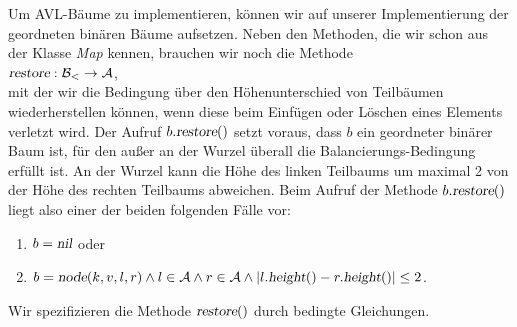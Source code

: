 Um  AVL-B\"aume zu  implementieren, k\"onnen wir auf unserer Implementierung der geordneten
bin\"aren B\"aume aufsetzen. 
Neben den Methoden, die wir schon aus der Klasse \textsl{Map} kennen, brauchen wir noch
die Methode \\[0.2cm]
\hspace*{1.3cm} $\textsl{restore}: \mathcal{B}_< \rightarrow \mathcal{A}$, \\[0.2cm]
mit der wir die Bedingung \"uber den H\"ohenunterschied von
Teilb\"aumen wiederherstellen k\"onnen, wenn diese beim Einf\"ugen oder L\"oschen eines Elements
verletzt wird.  
Der Aufruf $b.\textsl{restore}()$ setzt voraus, dass $b$ ein geordneter bin\"arer Baum ist,
f\"ur den au{\ss}er an der Wurzel \"uberall die Balancierungs-Bedingung erf\"ullt ist.
An der Wurzel kann die H\"ohe des linken Teilbaums um maximal 2 von der H\"ohe des rechten
Teilbaums abweichen. Beim Aufruf der Methode $b.\textsl{restore}()$ liegt also einer der
beiden folgenden F\"alle vor: 
\begin{enumerate}
\item $b = \textsl{nil}$ \quad oder
\item $b = \textsl{node}(k,v,l,r) \wedge l \in \mathcal{A} \wedge r \in \mathcal{A} \wedge
       |l.\textsl{height}() - r.\textsl{height}()| \leq 2$.
\end{enumerate}
 Wir spezifizieren die Methode $\textsl{restore}()$ durch
bedingte Gleichungen.
